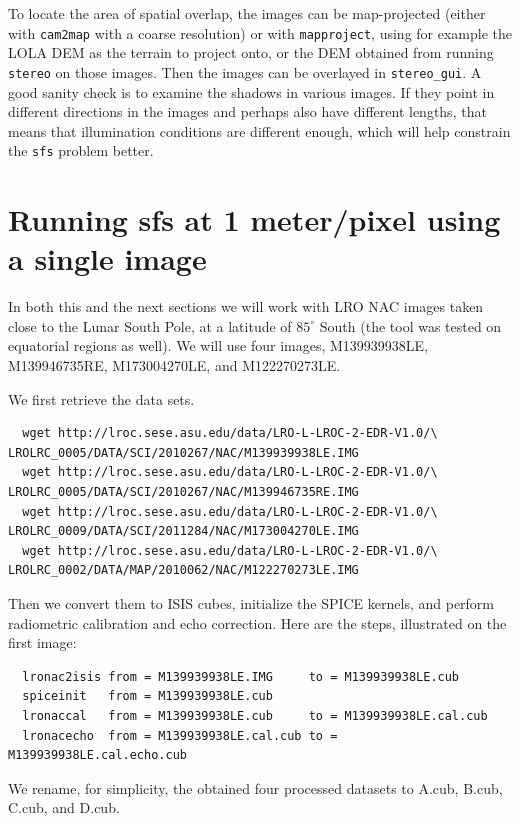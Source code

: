To locate the area of spatial overlap, the images can be map-projected (either
with \texttt{cam2map} with a coarse resolution) or with
\texttt{mapproject}, using for example the LOLA DEM as the terrain to project onto, 
or the DEM obtained from running \texttt{stereo} on those images. Then the images can be overlayed
in \texttt{stereo\_gui}. A good sanity check is to examine the shadows in
various images. If they point in different directions in the images and perhaps
also have different lengths, that means that illumination conditions are
different enough, which will help constrain the \texttt{sfs} problem better.

\section{Running sfs at 1 meter/pixel using a single image}

In both this and the next sections we will work with LRO NAC images taken
close to the Lunar South Pole, at a latitude of $85^\circ$ South (the tool was
tested on equatorial regions as well). We will use four images,
M139939938LE, M139946735RE, M173004270LE, and M122270273LE.

We first retrieve the data sets.
\begin{verbatim}
  wget http://lroc.sese.asu.edu/data/LRO-L-LROC-2-EDR-V1.0/\
LROLRC_0005/DATA/SCI/2010267/NAC/M139939938LE.IMG
  wget http://lroc.sese.asu.edu/data/LRO-L-LROC-2-EDR-V1.0/\
LROLRC_0005/DATA/SCI/2010267/NAC/M139946735RE.IMG
  wget http://lroc.sese.asu.edu/data/LRO-L-LROC-2-EDR-V1.0/\
LROLRC_0009/DATA/SCI/2011284/NAC/M173004270LE.IMG
  wget http://lroc.sese.asu.edu/data/LRO-L-LROC-2-EDR-V1.0/\
LROLRC_0002/DATA/MAP/2010062/NAC/M122270273LE.IMG
\end{verbatim}

Then we convert them to ISIS cubes, initialize the SPICE kernels, and
perform radiometric calibration and echo correction. Here are the steps, 
illustrated on the first image:
\begin{verbatim}  
  lronac2isis from = M139939938LE.IMG     to = M139939938LE.cub
  spiceinit   from = M139939938LE.cub
  lronaccal   from = M139939938LE.cub     to = M139939938LE.cal.cub
  lronacecho  from = M139939938LE.cal.cub to = M139939938LE.cal.echo.cub
\end{verbatim}
We rename, for simplicity, the obtained four processed datasets to
A.cub, B.cub, C.cub, and D.cub.


